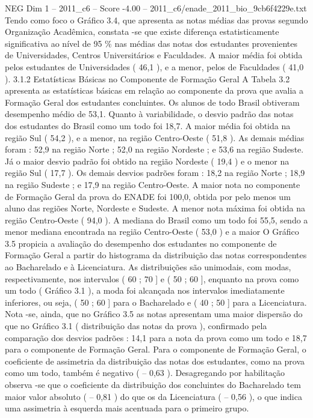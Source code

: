 \begin{textsample}{NEG Dim 1 – 2011\_c6 – Score -4.00 – 2011\_c6/enade\_2011\_bio\_9cb6f4229e.txt}
Tendo como foco o Gráfico 3.4, que apresenta as notas médias das provas segundo Organização Acadêmica, constata -se que existe diferença estatisticamente significativa ao nível de 95 \% nas médias das notas dos estudantes provenientes de Universidades, Centros Universitários e Faculdades.
A maior média foi obtida pelos estudantes de Universidades ( 46,1 ), e a menor, pelos de Faculdades ( 41,0 ). 3.1.2 Estatísticas Básicas no Componente de Formação Geral A Tabela 3.2 apresenta as estatísticas básicas em relação ao componente da prova que avalia a Formação Geral dos estudantes concluintes.
Os alunos de todo Brasil obtiveram desempenho médio de 53,1.
Quanto à variabilidade, o desvio padrão das notas dos estudantes do Brasil como um todo foi 18,7.
A maior média foi obtida na região Sul ( 54,2 ), e a menor, na região Centro-Oeste ( 51,8 ).
As demais médias foram : 52,9 na região Norte ; 52,0 na região Nordeste ; e 53,6 na região Sudeste.
Já o maior desvio padrão foi obtido na região Nordeste ( 19,4 ) e o menor na região Sul ( 17,7 ).
Os demais desvios padrões foram : 18,2 na região Norte ; 18,9 na região Sudeste ; e 17,9 na região Centro-Oeste.
A maior nota no componente de Formação Geral da prova do ENADE foi 100,0, obtida por pelo menos um aluno das regiões Norte, Nordeste e Sudeste.
A menor nota máxima foi obtida na região Centro-Oeste ( 94,0 ).
A mediana do Brasil como um todo foi 55,5, sendo a menor mediana encontrada na região Centro-Oeste ( 53,0 ) e a maior O Gráfico 3.5 propicia a avaliação do desempenho dos estudantes no componente de Formação Geral a partir do histograma da distribuição das notas correspondentes ao Bacharelado e à Licenciatura.
As distribuições são unimodais, com modas, respectivamente, nos intervalos ( 60 ; 70 ] e ( 50 ; 60 ], enquanto na prova como um todo ( Gráfico 3.1 ), a moda foi alcançada nos intervalos imediatamente inferiores, ou seja, ( 50 ; 60 ] para o Bacharelado e ( 40 ; 50 ] para a Licenciatura.
Nota -se, ainda, que no Gráfico 3.5 as notas apresentam uma maior dispersão do que no Gráfico 3.1 ( distribuição das notas da prova ), confirmado pela comparação dos desvios padrões : 14,1 para a nota da prova como um todo e 18,7 para o componente de Formação Geral.
Para o componente de Formação Geral, o coeficiente de assimetria da distribuição das notas dos estudantes, como na prova como um todo, também é negativo ( – 0,63 ).
Desagregando por habilitação observa -se que o coeficiente da distribuição dos concluintes do Bacharelado tem maior valor absoluto ( – 0,81 ) do que os da Licenciatura ( – 0,56 ), o que indica uma assimetria à esquerda mais acentuada para o primeiro grupo.

\end{textsample}
